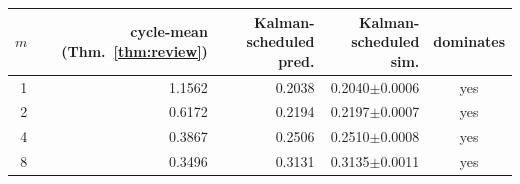 \begin{tabular}{rrrrc}
\toprule
$m$ & cycle-mean (Thm.~\ref{thm:review}) & Kalman-scheduled pred. & Kalman-scheduled sim. & dominates \\
\midrule
1 & 1.1562 & 0.2038 & 0.2040$\pm$0.0006 & yes \\
2 & 0.6172 & 0.2194 & 0.2197$\pm$0.0007 & yes \\
4 & 0.3867 & 0.2506 & 0.2510$\pm$0.0008 & yes \\
8 & 0.3496 & 0.3131 & 0.3135$\pm$0.0011 & yes \\
\bottomrule
\end{tabular}
